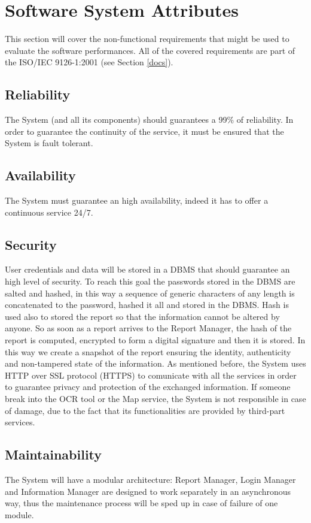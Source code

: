 \documentclass{report}
\begin{document}
\section{Software System Attributes}
This section will cover the non-functional requirements that might be used to evaluate the software performances. All of the covered requirements are part of the ISO/IEC 9126-1:2001 (see Section \ref{docs}).
\subsection{Reliability}
The System (and all its components) should guarantees a 99\% of reliability. In order to guarantee the continuity of the service, it must be ensured that the System is fault tolerant.
\subsection{Availability}
The System must guarantee an high availability, indeed it has to offer a continuous service 24/7. 
\subsection{Security} \label{sec:security}
User credentials and data will be stored in a DBMS that should guarantee an high level of security. To reach this goal the passwords stored in the DBMS are salted and hashed, in this way a sequence of generic characters of any length is concatenated to the password, hashed it all and stored in the DBMS.
Hash is used also to stored the report so that the information cannot be altered by anyone. So as soon as a report arrives to the Report Manager, the hash of the report is computed, encrypted to form a digital signature and then it is stored. In this way we create a snapshot of the report ensuring the identity, authenticity and non-tampered state of the information.
As mentioned before, the System uses HTTP over SSL protocol (HTTPS) to comunicate with all the services in order to guarantee privacy and protection of the exchanged information.
\newline
If someone break into the OCR tool or the Map service, the System is not responsible in case of damage, due to the fact that its functionalities are provided by third-part services.  
\subsection{Maintainability}
The System will have a modular architecture: Report Manager, Login Manager and Information Manager are designed to work separately in an asynchronous way, thus the maintenance process will be sped up in case of failure of one module.
\end{document}
